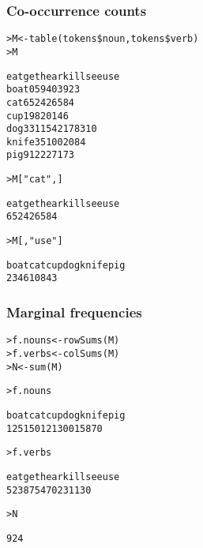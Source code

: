 \begin{frame}[fragile]
  \frametitle{Co-occurrence counts}

\ungap
\begin{alltt}\small
{}
> M <- table(tokens\$noun, tokens\$verb)
> M \begin{Rout}
        eat get hear kill see use
  boat    0  59    4    0  39  23
  cat     6  52    4   26  58   4
  cup     1  98    2    0  14   6
  dog    33 115   42   17  83  10
  knife   3  51    0    0  20  84
  pig     9  12    2   27  17   3 \end{Rout}

> M["cat", ] \begin{Rout}
 eat  get hear kill  see  use 
   6   52    4   26   58    4  \end{Rout}
> M[, "use"] \begin{Rout}
 boat   cat   cup   dog knife   pig 
   23     4     6    10    84     3 
\end{Rout}
\end{alltt}
\end{frame}

\begin{frame}[fragile]
  \frametitle{Marginal frequencies}

\ungap
\begin{alltt}\small
{}
> f.nouns <- rowSums(M)
> f.verbs <- colSums(M)
> N <- sum(M)  

> f.nouns \begin{Rout}
 boat   cat   cup   dog knife   pig 
  125   150   121   300   158    70 \end{Rout}
> f.verbs \begin{Rout}
 eat  get hear kill  see  use 
  52  387   54   70  231  130 \end{Rout}
> N \begin{Rout}
[1] 924 \end{Rout}
\end{alltt}
\end{frame}

